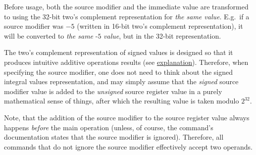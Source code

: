 Before usage, both the source modifier and the immediate value are transformed to  using the 32-bit two's complement representation for \textit{the same value}. E.g.\ if a source modifier was $-5$ (written in 16-bit two's complement representation), it will be converted to \textit{the same} $\textit{-5}$ \textit{value}, but in the 32-bit representation.

The two's complement representation of signed values is designed so that it produces intuitive additive operations results (see \href{https://en.wikipedia.org/wiki/Two\%27s_complement#Addition}{explanation}).
Therefore, when specifying the source modifier, one does not need to think about the signed integral values representation, and may simply assume that the \textit{signed} source modifier value is added to the \textit{unsigned} source register value in a purely mathematical sense of things, after which the resulting value is taken modulo $2^{32}$.

Note, that the addition of the source modifier to the source register value always happens \textit{before} the main operation (unless, of course, the command's documentation states that the source modifier is ignored). Therefore, all  commands that do not ignore the source modifier effectively accept two  operands.